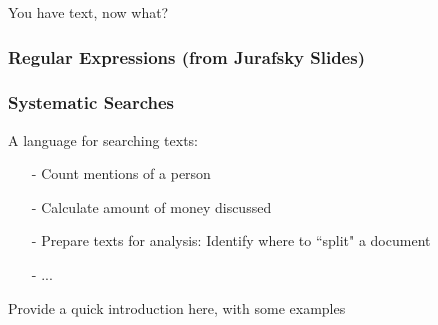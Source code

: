 \documentclass{beamer}
\numberwithin{equation}{section}
\begin{document}
\begin{frame}

\huge
You have text, now what?


\end{frame}


\begin{frame}
\frametitle{Regular Expressions (from Jurafsky Slides) }

\begin{center}
\end{center}


\end{frame}


\begin{frame}
\frametitle{Systematic Searches}

A language for searching texts:
\begin{itemize}
\item[-] Count mentions of a person
\item[-] Calculate amount of money discussed
\item[-] Prepare texts for analysis: Identify where to ``split" a document
\item[-] ...
\end{itemize}

Provide a quick introduction here, with some examples

\end{frame}
\end{document}
